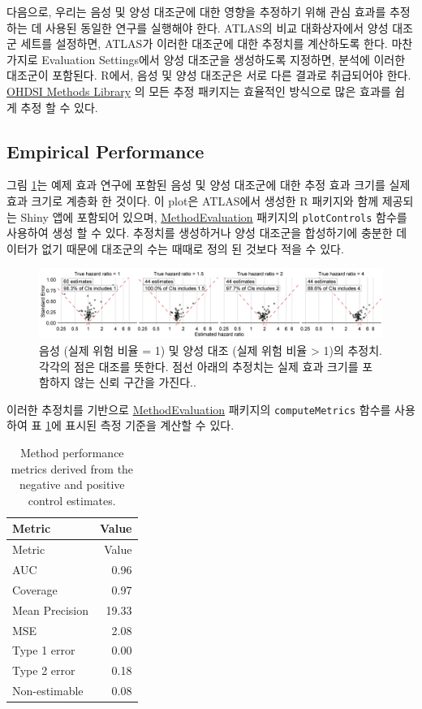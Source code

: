 \documentclass[11pt]{book}
\theoremstyle{definition}
\theoremstyle{definition}
\theoremstyle{definition}
\theoremstyle{remark}
\begin{document}
다음으로, 우리는 음성 및 양성 대조군에 대한 영향을 추정하기 위해 관심
효과를 추정하는 데 사용된 동일한 연구를 실행해야 한다. ATLAS의 비교
대화상자에서 양성 대조군 세트를 설정하면, ATLAS가 이러한 대조군에 대한
추정치를 계산하도록 한다. 마찬가지로 Evaluation Settings에서 양성
대조군을 생성하도록 지정하면, 분석에 이러한 대조군이 포함된다. R에서,
음성 및 양성 대조군은 서로 다른 결과로 취급되어야 한다.
\href{https://ohdsi.github.io/MethodsLibrary/}{OHDSI Methods Library} 의
모든 추정 패키지는 효율적인 방식으로 많은 효과를 쉽게 추정 할 수 있다.

\subsection{Empirical Performance}\label{empirical-performance}

그림 \ref{fig:controls}는 예제 효과 연구에 포함된 음성 및 양성 대조군에
대한 추정 효과 크기를 실제 효과 크기로 계층화 한 것이다. 이 plot은
ATLAS에서 생성한 R 패키지와 함께 제공되는 Shiny 앱에 포함되어 있으며,
\href{https://ohdsi.github.io/MethodEvaluation/}{MethodEvaluation}
패키지의 \texttt{plotControls} 함수를 사용하여 생성 할 수 있다. 추정치를
생성하거나 양성 대조군을 합성하기에 충분한 데이터가 없기 때문에 대조군의
수는 때때로 정의 된 것보다 적을 수 있다.

\begin{figure}

{\centering \includegraphics[width=1\linewidth]{images/MethodValidity/controls} 

}

\caption{음성 (실제 위험 비율 = 1) 및 양성 대조 (실제 위험 비율 > 1)의 추정치. 각각의 점은 대조를 뜻한다. 점선 아래의 추정치는 실제 효과 크기를 포함하지 않는 신뢰 구간을 가진다..}\label{fig:controls}
\end{figure}

이러한 추정치를 기반으로
\href{https://ohdsi.github.io/MethodEvaluation/}{MethodEvaluation}
패키지의 \texttt{computeMetrics} 함수를 사용하여 표
\ref{tab:exampleMetrics}에 표시된 측정 기준을 계산할 수 있다.

\begin{longtable}[]{@{}lr@{}}
\caption{\label{tab:exampleMetrics} Method performance metrics derived from
the negative and positive control estimates.}\tabularnewline
\toprule
Metric & Value\tabularnewline
\midrule
\endfirsthead
\toprule
Metric & Value\tabularnewline
\midrule
\endhead
AUC & 0.96\tabularnewline
Coverage & 0.97\tabularnewline
Mean Precision & 19.33\tabularnewline
MSE & 2.08\tabularnewline
Type 1 error & 0.00\tabularnewline
Type 2 error & 0.18\tabularnewline
Non-estimable & 0.08\tabularnewline
\bottomrule
\end{longtable}
\end{document}
